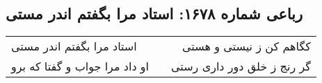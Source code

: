 \begin{center}
\section*{رباعی شماره ۱۶۷۸: استاد مرا بگفتم اندر مستی}
\label{sec:1678}
\begin{longtable}{l p{0.5cm} r}
استاد مرا بگفتم اندر مستی
&&
کگاهم کن ز نیستی و هستی
\\
او داد مرا جواب و گفتا که برو
&&
گر رنج ز خلق دور داری رستی
\\
\end{longtable}
\end{center}
